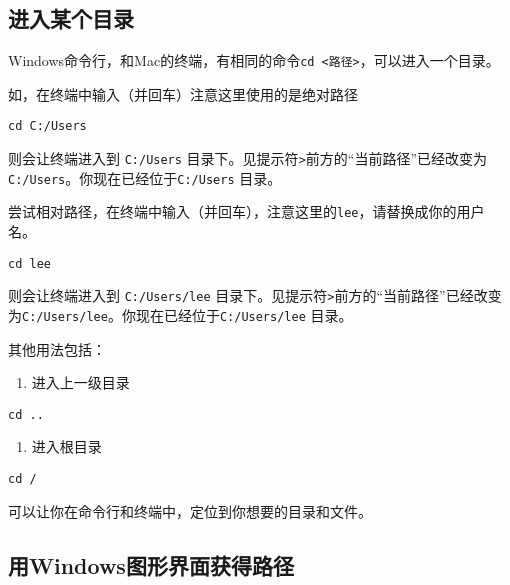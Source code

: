 \documentclass[
  letterpaper,
  DIV=11,
  numbers=noendperiod]{scrreprt}
\providecommand{\tightlist}{%
  \setlength{\itemsep}{0pt}\setlength{\parskip}{0pt}}\usepackage{longtable,booktabs,array}
\begin{document}
\hypertarget{ux8fdbux5165ux67d0ux4e2aux76eeux5f55}{%
\subsection{进入某个目录}\label{ux8fdbux5165ux67d0ux4e2aux76eeux5f55}}

Windows命令行，和Mac的终端，有相同的命令\texttt{cd\ \textless{}路径\textgreater{}}，可以进入一个目录。

如，在终端中输入（并回车）注意这里使用的是绝对路径

\begin{verbatim}
cd C:/Users 
\end{verbatim}

则会让终端进入到 \texttt{C:/Users}
目录下。见提示符\texttt{\textgreater{}}前方的``当前路径''已经改变为\texttt{C:/Users}。你现在已经位于\texttt{C:/Users}
目录。

尝试相对路径，在终端中输入（并回车），注意这里的\texttt{lee}，请替换成你的用户名。

\begin{verbatim}
cd lee
\end{verbatim}

则会让终端进入到 \texttt{C:/Users/lee}
目录下。见提示符\texttt{\textgreater{}}前方的``当前路径''已经改变为\texttt{C:/Users/lee}。你现在已经位于\texttt{C:/Users/lee}
目录。

其他用法包括：

\begin{enumerate}
\def\labelenumi{\arabic{enumi}.}
\tightlist
\item
  进入上一级目录
\end{enumerate}

\begin{verbatim}
cd ..
\end{verbatim}

\begin{enumerate}
\def\labelenumi{\arabic{enumi}.}
\setcounter{enumi}{1}
\tightlist
\item
  进入根目录
\end{enumerate}

\begin{verbatim}
cd /
\end{verbatim}

可以让你在命令行和终端中，定位到你想要的目录和文件。

\hypertarget{use_win}{%
\subsection{用Windows图形界面获得路径}\label{use_win}}
\end{document}
